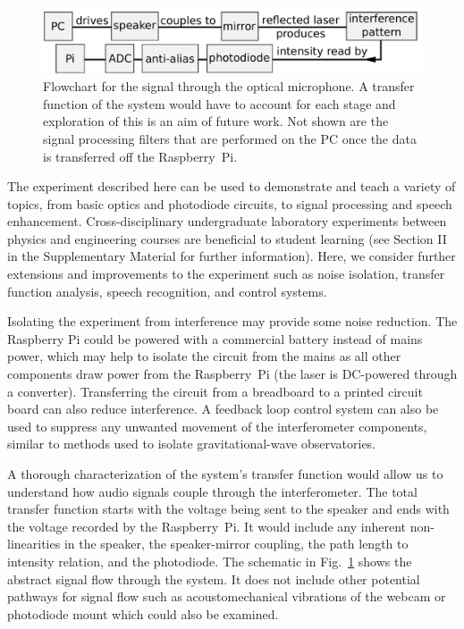 \documentclass[paper-main.tex]{subfiles}
\begin{document}
\begin{figure}
    \includegraphics[width=.8\textwidth]{figures/pipeline_nobox.pdf}
	\caption{\label{fig:pipeline_highlighted}
Flowchart for the signal through the optical microphone. 
A transfer function of the system would have to account for each stage and exploration of this is an aim of future work. 
Not shown are the signal processing filters that are performed on the PC once the data is transferred off the Raspberry~Pi.
}
\end{figure}

The experiment described here can be used to demonstrate and teach a variety of topics, from basic optics and photodiode circuits, to signal processing and speech enhancement. 
Cross-disciplinary undergraduate laboratory experiments between physics and engineering courses are beneficial to student learning (see Section II in the Supplementary Material for further information). 
Here, we consider further extensions and improvements to the experiment such as noise isolation, transfer function analysis, speech recognition, and control systems.



Isolating the experiment from interference may provide some noise reduction. 
The Raspberry Pi could be powered with a commercial battery instead of mains power, which may help to isolate the circuit from the mains as all other components draw power from the Raspberry~Pi (the laser is DC-powered through a converter).
Transferring the circuit from a breadboard to a printed circuit board can also reduce interference.\cite{elfekey2013design}
A feedback loop control system can also be used to suppress any unwanted movement of the interferometer components,\citep{abbott2017exploring, Sekiguchi:2016bmv, verhoeven2009robust} similar to methods used to isolate gravitational-wave observatories. 


A thorough characterization of the system's transfer function would allow us to understand how audio signals couple through the interferometer. 
The total transfer function starts with the voltage being sent to the speaker and ends with the voltage recorded by the Raspberry~Pi. 
It would include any inherent non-linearities in the speaker, the speaker-mirror coupling, the path length to intensity relation, and the photodiode. 
The schematic in Fig.~\ref{fig:pipeline_highlighted} shows the abstract signal flow through the system.
It does not include other potential pathways for signal flow such as acoustomechanical vibrations of the webcam or photodiode mount which could also be examined.
\end{document}
